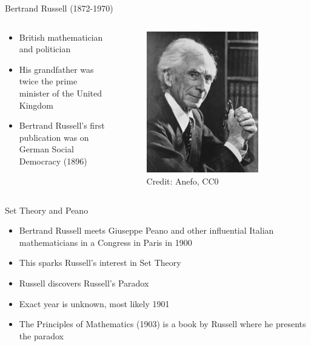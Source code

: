 \documentclass[utf8]{beamer}
\begin{document}
\begin{frame}{Bertrand Russell (1872-1970)}
\begin{columns}
\begin{column}{0.6\textwidth}
\begin{itemize}
\item British mathematician and politician
\item His grandfather was twice the prime minister of the United Kingdom
\item Bertrand Russell's first publication was on German Social Democracy (1896)
\end{itemize}
\end{column}
\begin{column}{0.4\textwidth}
\begin{figure}
\centering
\includegraphics[width=0.8\textwidth]{images/russell.jpg}
\\
\tiny Credit: Anefo, CC0
\end{figure}
\end{column}
\end{columns}
\end{frame}

\begin{frame}{Set Theory and Peano}
\begin{itemize}
\item Bertrand Russell meets Giuseppe Peano and other influential Italian mathematicians in a Congress in Paris in 1900
\item This sparks Russell's interest in Set Theory
\item Russell discovers Russell's Paradox
\item Exact year is unknown, most likely 1901
\item The Principles of Mathematics (1903) is a book by Russell where he presents the paradox
\end{itemize}
\end{frame}
\end{document}
